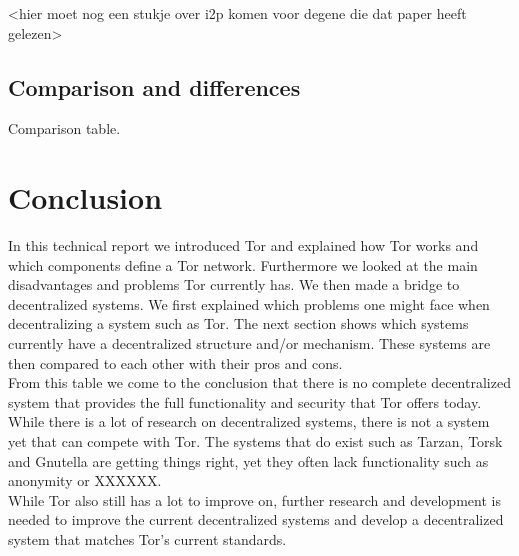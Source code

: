 \documentclass[journal]{IEEEtran}
\begin{document}
			<hier moet nog een stukje over i2p komen voor degene die dat paper heeft gelezen>
			
		\subsection{Comparison and differences}
			Comparison table.
	
	\section{Conclusion}
		In this technical report we introduced Tor and explained how Tor works and which components define a Tor network. Furthermore we looked at the main disadvantages and problems Tor currently has. We then made a bridge to decentralized systems. We first explained which problems one might face when decentralizing a system such as Tor. The next section shows which systems currently have a decentralized structure and/or mechanism. These systems are then compared to each other with their pros and cons.\\
		
		From this table we come to the conclusion that there is no complete decentralized system that provides the full functionality and security that Tor offers today. While there is a lot of research on decentralized systems, there is not a system yet that can compete with Tor. The systems that do exist such as Tarzan, Torsk and Gnutella are getting things right, yet they often lack functionality such as anonymity or XXXXXX.\\
		
While Tor also still has a lot to improve on, further research and development is needed to improve the current decentralized systems and develop a decentralized system that matches Tor's current standards.

	\appendices
			
			
			
			
\end{document}
